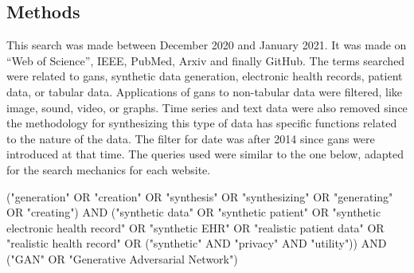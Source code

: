 
\subsection{Methods}
This search was made between December 2020 and January 2021. It was made on “Web of Science”, IEEE, PubMed, Arxiv and finally GitHub. The terms searched were related to \acp{gan}, synthetic data generation, electronic health records, patient data, or tabular data. Applications of \acp{gan} to non-tabular data were filtered, like image, sound, video, or graphs. Time series and text data were also removed since the methodology for synthesizing this type of data has specific functions related to the nature of the data. The filter for date was after 2014 since \acp{gan} were introduced at that time. The queries used were similar to the one below, adapted for the search mechanics for each website.


\begin{scriptsize}

{\selectfont
("generation" OR "creation" OR "synthesis" OR "synthesizing" OR "generating" OR "creating") AND ("synthetic data" OR "synthetic patient" OR "synthetic electronic health record" OR "synthetic EHR" OR "realistic patient data" OR "realistic health record" OR ("synthetic" AND "privacy" AND "utility"))  AND ("GAN" OR "Generative Adversarial Network")}
\end{scriptsize}

